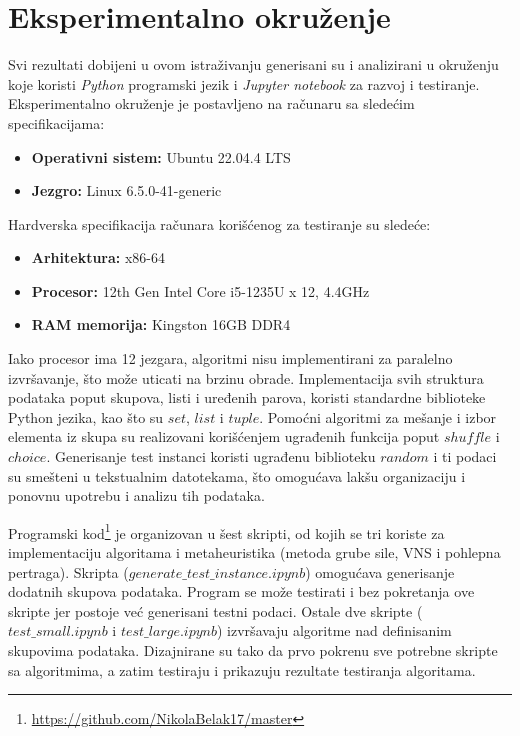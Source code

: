 \documentclass[12pt,oneside]{memoir}
\begin{document}
\section{Eksperimentalno okruženje}
Svi rezultati dobijeni u ovom istraživanju generisani su i analizirani u okruženju koje koristi \textit{Python} programski jezik i \textit{Jupyter notebook} za razvoj i testiranje. Eksperimentalno okruženje je postavljeno na računaru sa sledećim specifikacijama:
\begin{itemize}
    \item \textbf{Operativni sistem:} Ubuntu 22.04.4 LTS
    \item \textbf{Jezgro:} Linux 6.5.0-41-generic
\end{itemize}

Hardverska specifikacija računara korišćenog za testiranje su sledeće:
\begin{itemize}
    \item \textbf{Arhitektura:} x86-64
    \item \textbf{Procesor:} 12th Gen Intel Core i5-1235U x 12, 4.4GHz
    \item \textbf{RAM memorija:} Kingston 16GB DDR4
\end{itemize}

Iako procesor ima 12 jezgara, algoritmi nisu implementirani za paralelno izvršavanje, što može uticati na brzinu obrade. Implementacija svih struktura podataka poput skupova, listi i uređenih parova, koristi standardne biblioteke Python jezika, kao što su $set$, $list$ i $tuple$. Pomoćni algoritmi za mešanje i izbor elementa iz skupa su realizovani korišćenjem ugrađenih funkcija poput $shuffle$ i $choice$. Generisanje test instanci koristi ugrađenu biblioteku $random$ i ti podaci su smešteni u tekstualnim datotekama, što omogućava lakšu organizaciju i ponovnu upotrebu i analizu tih podataka.

Programski kod\footnote{\url{https://github.com/NikolaBelak17/master}} je organizovan u šest skripti, od kojih se tri koriste za implementaciju algoritama i metaheuristika (metoda grube sile, VNS i pohlepna pertraga). Skripta ($generate\_test\_instance.ipynb$) omogućava generisanje dodatnih skupova podataka. Program se može testirati i bez pokretanja ove skripte jer postoje već generisani testni podaci. Ostale dve skripte ($test\_small.ipynb$ i $test\_large.ipynb$) izvršavaju algoritme nad definisanim skupovima podataka. Dizajnirane su tako da prvo pokrenu sve potrebne skripte sa algoritmima, a zatim testiraju i prikazuju rezultate testiranja algoritama.
\end{document}
